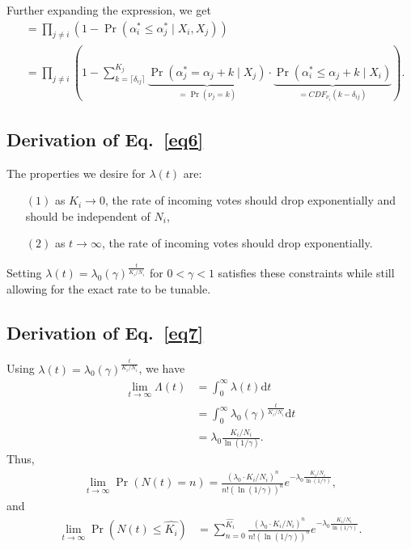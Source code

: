 \documentclass[format=acmsmall, review=true, screen=true, anonymous=true]{acmart}
\begin{document}
Further expanding the expression, we get
\begin{align*}
&= \prod_{j \neq i} \left( 1 - \Pr(\alpha^*_i \leq \alpha^*_j \mid X_i, X_j) \right)\\
&= \prod_{j \neq i} \left( 1 - \sum_{k=\lceil\delta_{ij}\rceil}^{K_j} \underbrace{\Pr(\alpha^*_j = \alpha_j + k \mid X_j)}_{= \Pr(\nu_j = k)} \cdot \underbrace{\Pr(\alpha^*_i \leq \alpha_j + k \mid X_i)}_{={CDF}_{\nu_i}(k - \delta_{ij})} \right).
\end{align*}

\subsection{Derivation of Eq.~\eqref{eq6}}
The properties we desire for $\lambda(t)$ are:
\begin{itemize}
\item[$(1)$] as $K_i \rightarrow 0$, the rate of incoming votes should drop exponentially and should be independent of $N_i$,
\item[$(2)$] as $t \rightarrow \infty$, the rate of incoming votes should drop exponentially.
\end{itemize}
Setting $\lambda (t) = \lambda_0 {(\gamma)}^{\frac{t}{K_i/N_i}}$ for $0 < \gamma < 1$ satisfies these constraints while still allowing for the exact rate to be tunable.

\subsection{Derivation of Eq.~\eqref{eq7}}
Using $\lambda (t) = \lambda_0 {(\gamma)}^{\frac{t}{K_i/N_i}}$, we have
\begin{align*}
\lim_{t \rightarrow \infty} \Lambda (t) &=\int _{0}^{\infty}\lambda (t)\mathrm{d}t\\
&= \int _{0}^{\infty} \lambda_0 {(\gamma)}^{\frac{t}{K_i/N_i}} \mathrm{d}t\\
&= \lambda_0 \frac{K_i/N_i}{\ln{(1/\gamma)}}.
\end{align*}
Thus,
\begin{align*}
\lim_{t\rightarrow \infty}\Pr\left(N(t) = n\right) = \frac{(\lambda_0 \cdot K_i/N_i)^n}{n!(\ln{(1/\gamma)})^n}e^{-\lambda_0 \frac{K_i/N_i}{\ln{(1/\gamma)}}},
\end{align*}
and
\begin{align*}
\lim_{t\rightarrow \infty}\Pr\left(N(t)\leq \hat{K_i}\right) & = \sum_{n=0}^{\hat{K_i}} \frac{(\lambda_0 \cdot K_i/N_i)^n}{n!(\ln{(1/\gamma)})^n}e^{-\lambda_0 \frac{K_i/N_i}{\ln{(1/\gamma)}}}.
\end{align*}




\end{document}

